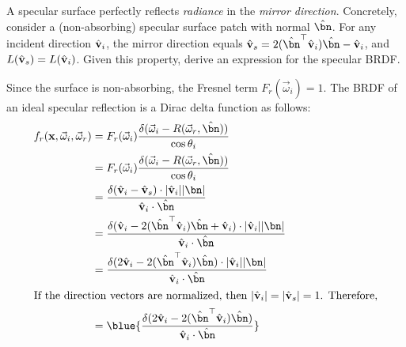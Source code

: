 \begin{problem}
\begin{enumroman}
    \newpage
    \item A specular surface perfectly reflects \emph{radiance} in the
      \emph{mirror direction}. Concretely, consider a (non-absorbing)
      specular surface patch with normal $\hat{\bn}$.
      For any incident direction $\hat{\mathbf{v}}_i$, the mirror direction
      equals $\hat{\bv}_s = 2(\hat{\bn}^\top \hat{\bv}_i)\hat{\bn} - \hat{\bv}_i$,
      and $L(\hat{\mathbf{v}}_s) = L(\hat{\mathbf{v}}_i)$.
      Given this property, derive an expression for the specular BRDF.
      \begin{answer}
        Since the surface is non-absorbing, the Fresnel term
        \( F_r(\vec{\omega}_i) = 1. \)
        The BRDF of an ideal specular reflection is a Dirac delta function as follows:
        \begin{align*}
          f_r(\bx, \vec{\omega}_i, \vec{\omega}_r) &= F_r(\vec{\omega}_i)
            \frac{\delta(\vec{\omega}_i - R(\vec{\omega}_r, \hat{\bn}))}{\cos \theta_i} \\
          &= F_r(\vec{\omega}_i) \frac{\delta(\vec{\omega}_i - R(\vec{\omega}_r,
            \hat{\bn}))}{\cos \theta_i} \\
          &= \frac{\delta(\hat{\bv}_i - \hat{\bv}_s)\cdot{\abs{\hat{\bv}_i}\abs{\bn}}}{\hat{\bv}_i \cdot \hat{\bn}} \\
          &= \frac{\delta(\hat{\bv}_i - 2(\hat{\bn}^\top \hat{\bv}_i)\hat{\bn}
            + \hat{\bv}_i) \cdot{\abs{\hat{\bv}_i}\abs{\bn}}}{\hat{\bv}_i \cdot \hat{\bn}} \\
          &= \frac{\delta(2\hat{\bv}_i - 2(\hat{\bn}^\top \hat{\bv}_i)\hat{\bn})
            \cdot{\abs{\hat{\bv}_i}\abs{\bn}}}
              {\hat{\bv}_i \cdot \hat{\bn}} \\
          \intertext{If the direction vectors are normalized, then
            $\abs{\hat{\bv}_i} = \abs{\hat{\bv}_s} = 1$. Therefore,}
          &= \blue{\frac{\delta(2\hat{\bv}_i - 2(\hat{\bn}^\top \hat{\bv}_i)\hat{\bn})}
              {\hat{\bv}_i \cdot \hat{\bn}}} \\
        \end{align*}
      \end{answer}
  \end{enumroman}
\end{problem}

